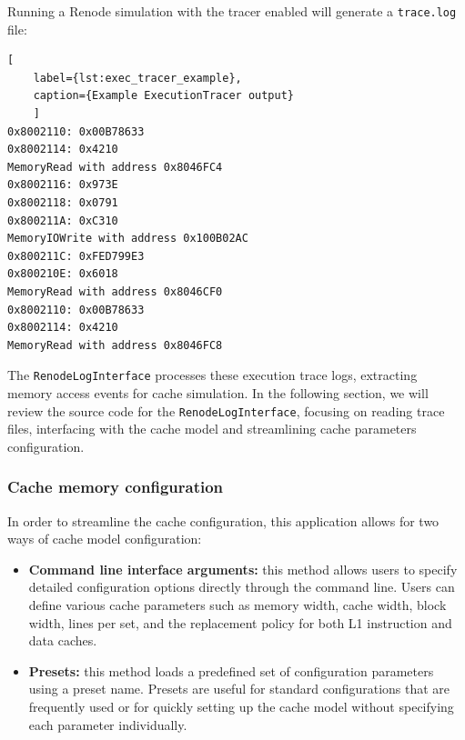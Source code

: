 \noindent Running a Renode simulation with the tracer enabled will generate a \texttt{trace.log} file:
\begin{center}
\centering
\begin{minipage}{\linewidth}
\begin{lstlisting}[
    label={lst:exec_tracer_example},
    caption={Example ExecutionTracer output}
    ]
0x8002110: 0x00B78633
0x8002114: 0x4210
MemoryRead with address 0x8046FC4
0x8002116: 0x973E
0x8002118: 0x0791
0x800211A: 0xC310
MemoryIOWrite with address 0x100B02AC
0x800211C: 0xFED799E3
0x800210E: 0x6018
MemoryRead with address 0x8046CF0
0x8002110: 0x00B78633
0x8002114: 0x4210
MemoryRead with address 0x8046FC8
\end{lstlisting}
\end{minipage}
\end{center}

\noindent The \texttt{RenodeLogInterface} processes these execution trace logs, extracting memory access events for cache simulation. In the following section, we will review %
the source code for the \texttt{RenodeLogInterface}, focusing on reading trace files, interfacing with the cache model and streamlining cache parameters configuration.

\subsubsection*{Cache memory configuration}

In order to streamline the cache configuration, this application allows for two ways of cache model configuration:
\begin{itemize}
    \item \textbf{Command line interface arguments:} this method allows users to specify detailed configuration options directly through the command line. Users can define various
        cache parameters such as memory width, cache width, block width, lines per set, and the replacement policy for both L1 instruction and data caches.
    \item \textbf{Presets:} this method loads a predefined set of configuration parameters using a preset name. Presets are useful for standard configurations that are frequently used or
        for quickly setting up the cache model without specifying each parameter individually.
\end{itemize}

